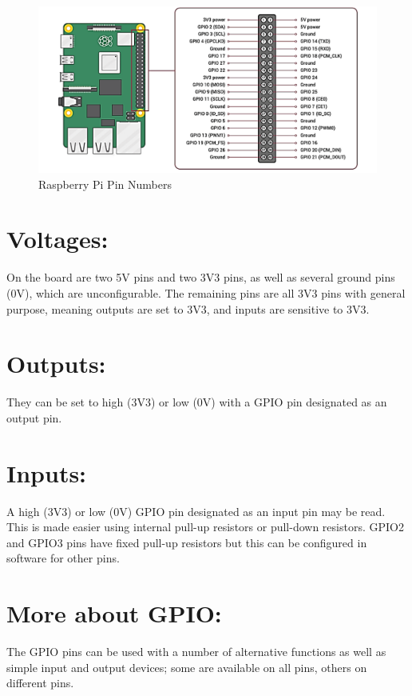 \begin{figure}[ht]
    \centering
    \includegraphics[width=1.2\textwidth]{figures/Raspberry Pi Pin Assignment.png}
    \caption{Raspberry Pi Pin Numbers}
\end{figure}

\section*{Voltages: }
On the board are two 5V pins and two 3V3 pins, as well as several ground pins (0V), which are unconfigurable. The remaining pins are all 3V3 pins with general purpose, meaning outputs are set to 3V3, and inputs are sensitive to 3V3.

\section*{Outputs: }
They can be set to high (3V3) or low (0V) with a GPIO pin designated as an output pin.

\section*{Inputs: }
A high (3V3) or low (0V) GPIO pin designated as an input pin may be read. This is made easier using internal pull-up resistors or pull-down resistors. GPIO2 and GPIO3 pins have fixed pull-up resistors but this can be configured in software for other pins.

\section*{More about GPIO: }
The GPIO pins can be used with a number of alternative functions as well as simple input and output devices; some are available on all pins, others on different pins.

